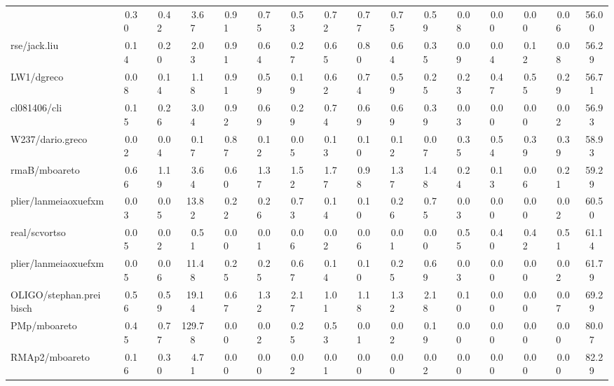 \begin{table}[hptb]
\begin{center}
\begin{tabular}{|l||c|c|c|c|c|c|c|c|c|c|c|c|c|c|c|}
{HLehmann/mhossain&~~0.30&~~0.42&~~3.67&~~0.91&~~0.75&~~0.53&~~0.72&~~0.77&~~0.75&~~0.59&~~0.08&~~0.00&~~0.00&~~0.06&~56.00\\ 
rse/jack.liu&~~0.14&~~0.20&~~2.03&~~0.91&~~0.64&~~0.27&~~0.65&~~0.80&~~0.64&~~0.35&~~0.09&~~0.04&~~0.12&~~0.08&~56.29\\ 
LW1/dgreco&~~0.08&~~0.14&~~1.18&~~0.91&~~0.59&~~0.19&~~0.62&~~0.74&~~0.59&~~0.25&~~0.23&~~0.47&~~0.55&~~0.29&~56.71\\ 
cl081406/cli&~~0.15&~~0.26&~~3.04&~~0.92&~~0.69&~~0.29&~~0.74&~~0.69&~~0.69&~~0.39&~~0.03&~~0.00&~~0.00&~~0.02&~56.93\\ 
W237/dario.greco&~~0.02&~~0.04&~~0.17&~~0.87&~~0.12&~~0.05&~~0.13&~~0.10&~~0.12&~~0.07&~~0.35&~~0.54&~~0.39&~~0.39&~58.93\\ 
rmaB/mboareto&~~0.66&~~1.19&~~3.64&~~0.60&~~1.37&~~1.52&~~1.77&~~0.98&~~1.37&~~1.48&~~0.24&~~0.13&~~0.06&~~0.21&~59.29\\ 
plier/lanmeiaoxuefxm&~~0.03&~~0.05&~13.82&~~0.22&~~0.26&~~0.73&~~0.14&~~0.10&~~0.26&~~0.75&~~0.03&~~0.00&~~0.00&~~0.02&~60.50\\ 
real/scvortso&~~0.05&~~0.02&~~0.51&~~0.00&~~0.01&~~0.06&~~0.02&~~0.06&~~0.01&~~0.00&~~0.55&~~0.40&~~0.42&~~0.51&~61.14\\ 
plier/lanmeiaoxuefxm&~~0.05&~~0.06&~11.48&~~0.25&~~0.25&~~0.67&~~0.14&~~0.10&~~0.25&~~0.69&~~0.03&~~0.00&~~0.00&~~0.02&~61.79\\ 
OLIGO/stephan.preibisch&~~0.56&~~0.59&~19.14&~~0.67&~~1.32&~~2.17&~~1.01&~~1.18&~~1.32&~~2.18&~~0.10&~~0.00&~~0.00&~~0.07&~69.29\\ 
PMp/mboareto&~~0.45&~~0.77&129.78&~~0.00&~~0.02&~~0.25&~~0.53&~~0.01&~~0.02&~~0.19&~~0.00&~~0.00&~~0.00&~~0.00&~80.07\\ 
RMAp2/mboareto&~~0.16&~~0.30&~~4.71&~~0.00&~~0.00&~~0.02&~~0.01&~~0.00&~~0.00&~~0.02&~~0.00&~~0.00&~~0.00&~~0.00&~82.29\\ 
\hline
\end{tabular}
\end{center}
\end{table}
